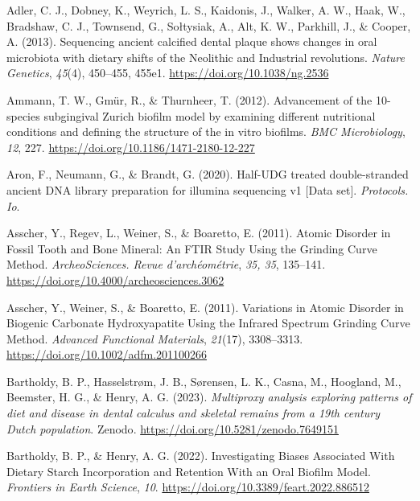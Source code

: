 \documentclass[
  letterpaper,
]{book}
\newlength{\cslhangindent}
\newlength{\cslentryspacingunit} %
\newenvironment{CSLReferences}[2] %
 {%
  \setlength{\parindent}{0pt}
  \ifodd #1
  \let\oldpar\par
  \def\par{\hangindent=\cslhangindent\oldpar}
  \fi
  \setlength{\parskip}{#2\cslentryspacingunit}
 }%
 {}
\begin{document}
\hypertarget{refs-3}{}
\begin{CSLReferences}{1}{0}
\leavevmode{}%
Adler, C. J., Dobney, K., Weyrich, L. S., Kaidonis, J., Walker, A. W.,
Haak, W., Bradshaw, C. J., Townsend, G., Sołtysiak, A., Alt, K. W.,
Parkhill, J., \& Cooper, A. (2013). Sequencing ancient calcified dental
plaque shows changes in oral microbiota with dietary shifts of the
{Neolithic} and {Industrial} revolutions. \emph{Nature Genetics},
\emph{45}(4), 450--455, 455e1. \url{https://doi.org/10.1038/ng.2536}

\leavevmode{}%
Ammann, T. W., Gmür, R., \& Thurnheer, T. (2012). Advancement of the
10-species subgingival {Zurich} biofilm model by examining different
nutritional conditions and defining the structure of the in vitro
biofilms. \emph{BMC Microbiology}, \emph{12}, 227.
\url{https://doi.org/10.1186/1471-2180-12-227}

\leavevmode{}%
Aron, F., Neumann, G., \& Brandt, G. (2020). Half-{UDG} treated
double-stranded ancient {DNA} library preparation for illumina
sequencing v1 {[}{Data} set{]}. \emph{Protocols. Io}.

\leavevmode{}%
Asscher, Y., Regev, L., Weiner, S., \& Boaretto, E. (2011). Atomic
{Disorder} in {Fossil Tooth} and {Bone Mineral}: {An FTIR Study Using}
the {Grinding Curve Method}. \emph{ArcheoSciences. Revue
d'archéométrie}, \emph{35, 35}, 135--141.
\url{https://doi.org/10.4000/archeosciences.3062}

\leavevmode{}%
Asscher, Y., Weiner, S., \& Boaretto, E. (2011). Variations in {Atomic
Disorder} in {Biogenic Carbonate Hydroxyapatite Using} the {Infrared
Spectrum Grinding Curve Method}. \emph{Advanced Functional Materials},
\emph{21}(17), 3308--3313. \url{https://doi.org/10.1002/adfm.201100266}

\leavevmode{}%
Bartholdy, B. P., Hasselstrøm, J. B., Sørensen, L. K., Casna, M.,
Hoogland, M., Beemster, H. G., \& Henry, A. G. (2023). \emph{Multiproxy
analysis exploring patterns of diet and disease in dental calculus and
skeletal remains from a 19th century {Dutch} population}. {Zenodo}.
\url{https://doi.org/10.5281/zenodo.7649151}

\leavevmode{}%
Bartholdy, B. P., \& Henry, A. G. (2022). Investigating {Biases
Associated With Dietary Starch Incorporation} and {Retention With} an
{Oral Biofilm Model}. \emph{Frontiers in Earth Science}, \emph{10}.
\url{https://doi.org/10.3389/feart.2022.886512}


\end{CSLReferences}
\end{document}
